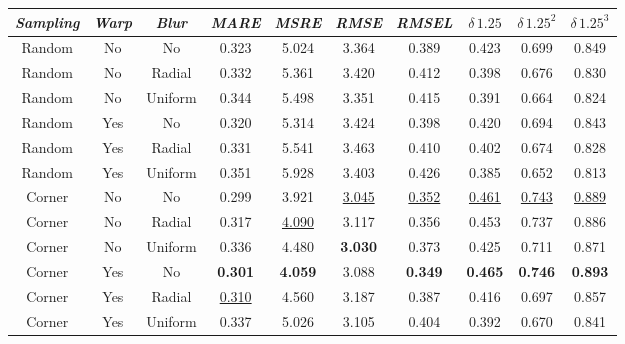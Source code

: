 \begin{table}
    \begin{tabular}{c|c|c|c|c|c|c|c|c|c}
        \emph{Sampling} & \emph{Warp} & \emph{Blur} & \emph{MARE} & \emph{MSRE} & \emph{RMSE} & \emph{RMSEL} & \emph{$\delta \, 1.25$} & \emph{$\delta \, 1.25^{2}$} & \emph{$\delta \, 1.25^{3}$} \\
        \hline
        Random & No  & No      &             0.323  &            5.024  &            3.364  &            0.389  &            0.423  &            0.699  &            0.849  \\
        Random & No  & Radial  &             0.332  &            5.361  &            3.420  &            0.412  &            0.398  &            0.676  &            0.830  \\
        Random & No  & Uniform &             0.344  &            5.498  &            3.351  &            0.415  &            0.391  &            0.664  &            0.824  \\
        Random & Yes & No      &             0.320  &            5.314  &            3.424  &            0.398  &            0.420  &            0.694  &            0.843  \\
        Random & Yes & Radial  &             0.331  &            5.541  &            3.463  &            0.410  &            0.402  &            0.674  &            0.828  \\
        Random & Yes & Uniform &             0.351  &            5.928  &            3.403  &            0.426  &            0.385  &            0.652  &            0.813  \\
        Corner & No  & No      &             0.299  &            3.921  & \underline{3.045} & \underline{0.352} & \underline{0.461} & \underline{0.743} & \underline{0.889} \\
        Corner & No  & Radial  &             0.317  & \underline{4.090} &            3.117  &            0.356  &            0.453  &            0.737  &            0.886  \\
        Corner & No  & Uniform &             0.336  &            4.480  &    \textbf{3.030} &            0.373  &            0.425  &            0.711  &            0.871  \\
        Corner & Yes & No      &     \textbf{0.301} &    \textbf{4.059} &            3.088  &    \textbf{0.349} &    \textbf{0.465} &    \textbf{0.746} &    \textbf{0.893} \\
        Corner & Yes & Radial  &  \underline{0.310} &            4.560  &            3.187  &            0.387  &            0.416  &            0.697  &            0.857  \\
        Corner & Yes & Uniform &             0.337  &            5.026  &            3.105  &            0.404  &            0.392  &            0.670  &            0.841  \\
    \end{tabular}
\end{table}